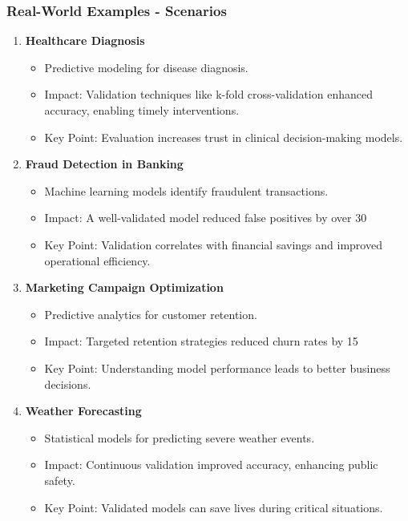 \documentclass[aspectratio=169]{beamer}
\begin{document}
\begin{frame}[fragile]
    \frametitle{Real-World Examples - Scenarios}
    \begin{enumerate}
        \item \textbf{Healthcare Diagnosis}
            \begin{itemize}
                \item Predictive modeling for disease diagnosis.
                \item Impact: Validation techniques like k-fold cross-validation enhanced accuracy, enabling timely interventions.
                \item Key Point: Evaluation increases trust in clinical decision-making models.
            \end{itemize}
        
        \item \textbf{Fraud Detection in Banking}
            \begin{itemize}
                \item Machine learning models identify fraudulent transactions.
                \item Impact: A well-validated model reduced false positives by over 30%
                \item Key Point: Validation correlates with financial savings and improved operational efficiency.
            \end{itemize}

        \item \textbf{Marketing Campaign Optimization}
            \begin{itemize}
                \item Predictive analytics for customer retention.
                \item Impact: Targeted retention strategies reduced churn rates by 15%
                \item Key Point: Understanding model performance leads to better business decisions.
            \end{itemize}
        
        \item \textbf{Weather Forecasting}
            \begin{itemize}
                \item Statistical models for predicting severe weather events.
                \item Impact: Continuous validation improved accuracy, enhancing public safety.
                \item Key Point: Validated models can save lives during critical situations.
            \end{itemize}
    \end{enumerate}
\end{frame}
\end{document}
